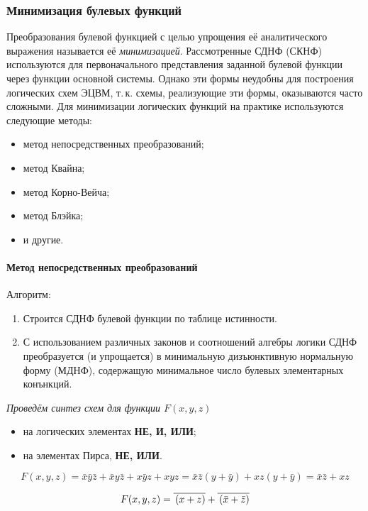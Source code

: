 \documentclass[10pt,a4paper,titlepage]{article}
\begin{document}
\subsubsection{Минимизация булевых функций}

Преобразования булевой функцией с целью упрощения её аналитического выражения называется её \textit{минимизацией}.
Рассмотренные СДНФ (СКНФ) используются для первоначального представления заданной булевой функции через функции основной системы.
Однако эти формы неудобны для построения логических схем ЭЦВМ, т.\,к. схемы, реализующие эти формы, оказываются часто сложными.
Для минимизации логических функций на практике используются следующие методы:

\begin{itemize}
\item метод непосредственных преобразований;
\item метод Квайна;
\item метод Корно-Вейча;
\item метод Блэйка;
\item и другие.
\end{itemize}

\paragraph{Метод непосредственных преобразований}

Алгоритм:

\begin{enumerate}
\item Строится СДНФ булевой функции по таблице истинности.
\item С использованием различных законов и соотношений алгебры логики СДНФ преобразуется (и упрощается) в минимальную дизъюнктивную нормальную форму (МДНФ), содержащую минимальное число булевых элементарных конънкций.
\end{enumerate}

\textit{Проведём синтез схем для функции $F(x,y,z)$}
\begin{itemize}
\item на логических элементах \textbf{НЕ, И, ИЛИ};
\item на элементах Пирса, \textbf{НЕ, ИЛИ}.
\end{itemize}

\[F(x,y,z)=\bar x\bar y\bar z+\bar xy\bar z+x\bar yz+xyz=\bar x\bar z\left(y+\bar y\right)+xz\left(y+\bar y\right)=\bar x\bar z+ xz\]

\[F(x,y,z)=\overline{\mathstrut \left( {x + z} \right)} + \overline{\mathstrut \left( \bar x+\bar z\right) }\]
\end{document}

